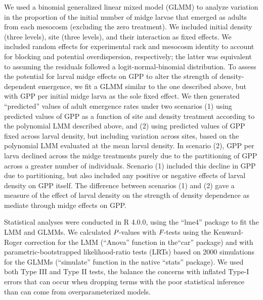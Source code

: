 We used a binomial generalized linear mixed model (GLMM) to analyze variation 
in the proportion of the initial number of midge larvae that emerged as adults from each mesocosm 
(excluding the zero treatment). 
We included initial density (three levels), site (three levels), and their interaction
as fixed effects. 
We included random effects for experimental rack and mesocosm identity to account
for blocking and potential overdispersion, respectively;
the latter was equivalent to assuming the residuals followed a logit-normal-binomial distribution.
To assess the potential for larval midge effects on GPP to alter the strength of density-dependent
emergence, 
we fit a GLMM similar to the one described above, 
but with GPP per initial midge larva as the sole fixed effect. 
We then generated ``predicted'' values of adult emergence rates under two scenarios 
(1) using predicted values of GPP as a function of site and density treatment according
to the polynomial LMM described above, 
and (2) using predicted values of GPP fixed across larval density, but including variation 
across sites, based on the polynomial LMM evaluated at the mean larval density.
In scenario (2), GPP per larva declined across the midge treatments purely due to 
the partitioning of GPP across a greater number of individuals.
Scenario (1) included this decline in GPP due to partitioning, but also included
any positive or negative effects of larval density on GPP itself.
The difference between scenarios (1) and (2) gave a measure of the effect of larval
density on the strength of density dependence as mediate through midge effects on GPP.

Statistical analyses were conducted in R 4.0.0,
using the ``lme4'' package to fit the LMM and GLMMs.
We calculated $\emph{P}$-values with $\emph{F}$-tests using
the Kenward-Roger correction for the LMM (``Anova'' function in the``car'' package)
and with parametric-bootstrapped likelihood-ratio tests (LRTs) based on 2000 simulations
for the GLMMs (``simulate'' function in the native ``stats'' package).
We used both Type III and Type II tests,
the balance the concerns with inflated Type-I errors that can occur when dropping 
terms with the poor statistical inference than can come from overparameterized models.









